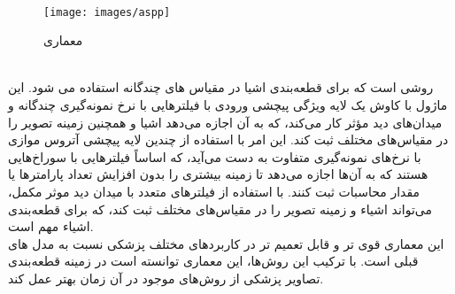 \\
\begin{figure}[h]
\centerline{\texttt{[image: images/aspp]}}
\caption[معماری ]{ معماری  \cite{chen2017deeplab}}
\label{fig:aspp}
\end{figure}
\\
 روشی است که برای قطعه‌بندی اشیا در مقیاس های چندگانه استفاده می شود. این ماژول با کاوش یک لایه ویژگی پیچشی ورودی با فیلترهایی با نرخ نمونه‌گیری چندگانه و میدان‌های دید مؤثر کار می‌کند، که به آن اجازه می‌دهد اشیا و همچنین زمینه تصویر را در مقیاس‌های مختلف ثبت کند. این امر با استفاده از چندین لایه پیچشی آتروس موازی با نرخ‌های نمونه‌گیری متفاوت به دست می‌آید، که اساساً فیلترهایی با سوراخ‌هایی هستند که به آن‌ها اجازه می‌دهد تا زمینه بیشتری را بدون افزایش تعداد پارامترها یا مقدار محاسبات ثبت کنند. با استفاده از فیلترهای متعدد با میدان دید موثر مکمل،  می‌تواند اشیاء و زمینه تصویر را در مقیاس‌های مختلف ثبت کند، که برای قطعه‌بندی  اشیاء مهم است\cite{chen2017deeplab}.
\\
این معماری قوی تر و قابل تعمیم تر در کاربردهای مختلف پزشکی نسبت به مدل های قبلی است. با ترکیب این روش‌ها، این معماری توانسته است در زمینه قطعه‌بندی تصاویر پزشکی از روش‌های موجود در آن زمان بهتر عمل کند\cite{jha2020doubleu}.
\\

